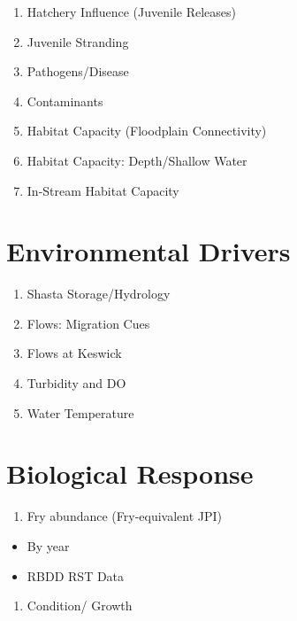 \documentclass[
]{book}
\providecommand{\tightlist}{%
  \setlength{\itemsep}{0pt}\setlength{\parskip}{0pt}}
\theoremstyle{definition}
\theoremstyle{definition}
\theoremstyle{definition}
\theoremstyle{definition}
\theoremstyle{remark}
\begin{document}
\begin{enumerate}
\def\labelenumi{\arabic{enumi}.}
\item
  Hatchery Influence (Juvenile Releases)
\item
  Juvenile Stranding
\item
  Pathogens/Disease
\item
  Contaminants
\item
  Habitat Capacity (Floodplain Connectivity)
\item
  Habitat Capacity: Depth/Shallow Water
\item
  In-Stream Habitat Capacity
\end{enumerate}

\hypertarget{environmental-drivers-1}{%
\section{Environmental Drivers}\label{environmental-drivers-1}}

\begin{enumerate}
\def\labelenumi{\arabic{enumi}.}
\item
  Shasta Storage/Hydrology
\item
  Flows: Migration Cues
\item
  Flows at Keswick
\item
  Turbidity and DO
\item
  Water Temperature
\end{enumerate}

\hypertarget{biological-response-2}{%
\section{Biological Response}\label{biological-response-2}}

\begin{enumerate}
\def\labelenumi{\arabic{enumi}.}
\tightlist
\item
  Fry abundance (Fry-equivalent JPI)
\end{enumerate}

\begin{itemize}
\tightlist
\item
  By year
\item
  RBDD RST Data
\end{itemize}

\begin{enumerate}
\def\labelenumi{\arabic{enumi}.}
\setcounter{enumi}{1}
\tightlist
\item
  Condition/ Growth
\end{enumerate}
\end{document}
